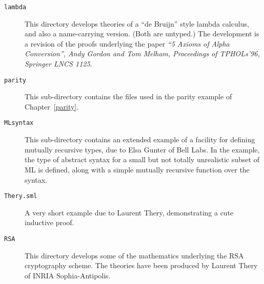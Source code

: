 \begin{description}
\item[\tt lambda]

This directory develops theories of a ``de Bruijn'' style lambda calculus,
and also a name-carrying version. (Both are untyped.) The development
is a revision of the proofs underlying the paper
{\it ``5 Axioms of Alpha Conversion'',
            Andy Gordon and Tom Melham,
            Proceedings of TPHOLs'96, Springer LNCS 1125}.

\item[\tt parity]

  This sub-directory contains the files used in the parity example of
  Chapter~\ref{parity}.

\item [\tt MLsyntax]

  This sub-directory contains an extended example of a facility for
  defining mutually recursive types, due to Elsa Gunter of Bell Labs.
  In the example, the type of abstract syntax for a small but not
  totally unrealistic subset of ML is defined, along with a simple
  mutually recursive function over the syntax.

\item[\tt Thery.sml]

  A very short example due to Laurent Thery, demonstrating a cute
  inductive proof.

\item[\tt RSA]

       This directory develops some of the mathematics underlying
       the RSA cryptography scheme. The theories have been
       produced by Laurent Thery of INRIA Sophia-Antipolis.

\end{description}


